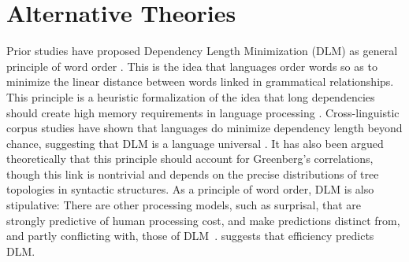 \documentclass[9pt,twocolumn,twoside,lineno]{pnas-new}
\begin{document}
%



\section{Alternative Theories}

Prior studies have proposed Dependency Length Minimization (DLM) as general principle of word order \cite{futrell2015largescale,liu2017dependency,temperley2018minimizing}.
This is the idea that languages order words so as to minimize the linear distance between words linked in grammatical relationships.
This principle is a heuristic formalization of the idea that long dependencies should create high memory requirements in language processing \cite{gibson1998linguistic,gibson2000dependency}.
Cross-linguistic corpus studies have shown that languages do minimize dependency length beyond chance, suggesting that DLM is a language universal \cite{futrell2015largescale,liu2017dependency,temperley2018minimizing}.
It has also been argued theoretically that this principle should account for Greenberg's correlations, though this link is nontrivial and depends on the precise distributions of tree topologies in syntactic structures.
As a principle of word order, DLM is also stipulative: There are other processing models, such as surprisal, that are strongly predictive of human processing cost, and make predictions distinct from, and partly conflicting with, those of DLM~\cite{hale2001probabilistic,levy2008expectation}.
\cite{futrell2017memory} suggests that efficiency predicts DLM.
\end{document}
